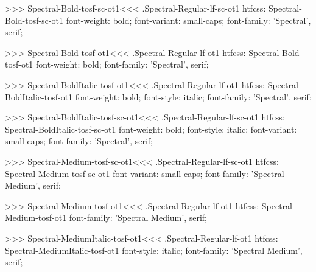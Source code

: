 >>>
\<Spectral-Bold-tosf-sc-ot1\><<<
.Spectral-Regular-lf-sc-ot1
htfcss:  Spectral-Bold-tosf-sc-ot1  font-weight: bold; font-variant: small-caps; font-family: 'Spectral', serif;

>>>
\<Spectral-Bold-tosf-ot1\><<<
.Spectral-Regular-lf-ot1
htfcss:  Spectral-Bold-tosf-ot1  font-weight: bold; font-family: 'Spectral', serif;

>>>
\<Spectral-BoldItalic-tosf-ot1\><<<
.Spectral-Regular-lf-ot1
htfcss:  Spectral-BoldItalic-tosf-ot1  font-weight: bold; font-style: italic; font-family: 'Spectral', serif;

>>>
\<Spectral-BoldItalic-tosf-sc-ot1\><<<
.Spectral-Regular-lf-sc-ot1
htfcss:  Spectral-BoldItalic-tosf-sc-ot1  font-weight: bold; font-style: italic; font-variant: small-caps; font-family: 'Spectral', serif;

>>>
\<Spectral-Medium-tosf-sc-ot1\><<<
.Spectral-Regular-lf-sc-ot1
htfcss:  Spectral-Medium-tosf-sc-ot1  font-variant: small-caps; font-family: 'Spectral Medium', serif;

>>>
\<Spectral-Medium-tosf-ot1\><<<
.Spectral-Regular-lf-ot1
htfcss:  Spectral-Medium-tosf-ot1  font-family: 'Spectral Medium', serif;

>>>
\<Spectral-MediumItalic-tosf-ot1\><<<
.Spectral-Regular-lf-ot1
htfcss:  Spectral-MediumItalic-tosf-ot1  font-style: italic; font-family: 'Spectral Medium', serif;

